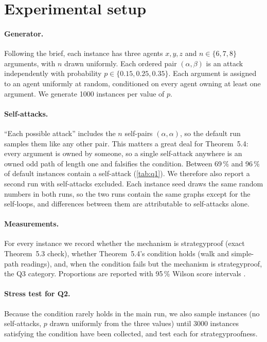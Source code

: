 \documentclass[11pt,a4paper]{article}
\theoremstyle{definition}
\begin{document}
\section{Experimental setup}\label{sec:setup}

\paragraph{Generator.} Following the brief, each instance has three agents $x,y,z$ and
$n\in\{6,7,8\}$ arguments, with $n$ drawn uniformly. Each ordered pair $(\alpha,\beta)$ is an attack
independently with probability $p\in\{0.15,0.25,0.35\}$. Each argument is assigned to an agent
uniformly at random, conditioned on every agent owning at least one argument. We generate 1000
instances per value of $p$.

\paragraph{Self-attacks.} ``Each possible attack'' includes the $n$ self-pairs $(\alpha,\alpha)$, so
the default run samples them like any other pair. This matters a great deal for Theorem~5.4: every
argument is owned by someone, so a single self-attack anywhere is an owned odd path of length one and
falsifies the condition. Between 69\,\% and 96\,\% of default instances contain a self-attack
(\cref{tab:q1}). We therefore also report a second run with self-attacks excluded. Each instance seed
draws the same random numbers in both runs, so the two runs contain the same graphs except for the
self-loops, and differences between them are attributable to self-attacks alone.

\paragraph{Measurements.} For every instance we record whether the mechanism is strategyproof
(exact Theorem~5.3 check), whether Theorem~5.4's condition holds (walk and simple-path readings), and,
when the condition fails but the mechanism is strategyproof, the Q3 category. Proportions are reported
with 95\,\% Wilson score intervals \cite{wilson1927}.

\paragraph{Stress test for Q2.} Because the condition rarely holds in the main run, we also sample
instances (no self-attacks, $p$ drawn uniformly from the three values) until 3000 instances satisfying
the condition have been collected, and test each for strategyproofness.
\end{document}
